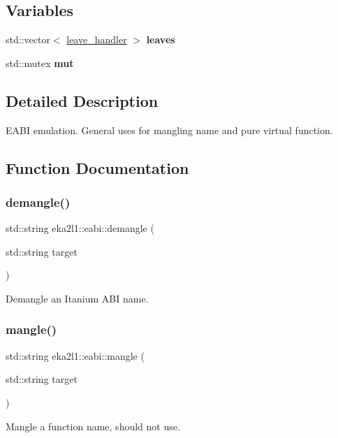 \subsection*{Variables}
\begin{DoxyCompactItemize}
\item 
\mbox{\label{namespaceeka2l1_1_1eabi_a8b6e0ce475bbdd0ee4574dc010d4a12b}} 
std\+::vector$<$ \mbox{\hyperlink{structeka2l1_1_1eabi_1_1leave__handler}{leave\+\_\+handler}} $>$ {\bfseries leaves}
\item 
\mbox{\label{namespaceeka2l1_1_1eabi_a19a537583195597f22832fa071fe401c}} 
std\+::mutex {\bfseries mut}
\end{DoxyCompactItemize}


\subsection{Detailed Description}
E\+A\+BI emulation. General uses for mangling name and pure virtual function. 

\subsection{Function Documentation}
\mbox{\label{namespaceeka2l1_1_1eabi_a9ea6f662d297f015cb4b8df3e823f299}} 
\subsubsection{\texorpdfstring{demangle()}{demangle()}}
{\footnotesize\ttfamily std\+::string eka2l1\+::eabi\+::demangle (\begin{DoxyParamCaption}\item[{std\+::string}]{target }\end{DoxyParamCaption})}

Demangle an Itanium A\+BI name. \mbox{\label{namespaceeka2l1_1_1eabi_a3d9fe6975adcc46f333e96086cdf86f9}} 
\subsubsection{\texorpdfstring{mangle()}{mangle()}}
{\footnotesize\ttfamily std\+::string eka2l1\+::eabi\+::mangle (\begin{DoxyParamCaption}\item[{std\+::string}]{target }\end{DoxyParamCaption})}

Mangle a function name, should not use. 